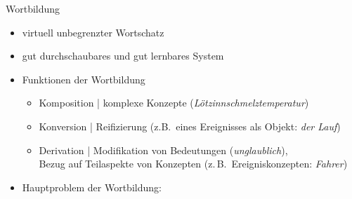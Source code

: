 \begin{frame}
  {Wortbildung}
  \onslide<+->
  \begin{itemize}[<+->]
    \item virtuell unbegrenzter Wortschatz
      \Zeile
    \item gut durchschaubares und \alert{gut lernbares} System\\
      \Zeile
    \item Funktionen der Wortbildung
      \begin{itemize}
        \item Komposition | \alert{komplexe Konzepte} (\textit{Lötzinnschmelztemperatur})
        \item Konversion | \alert{Reifizierung} (z.B.\ eines Ereignisses als Objekt: \textit{der Lauf})
        \item Derivation | \alert{Modifikation von Bedeutungen} (\textit{\alert{un}glaublich}),\\
          \alert{Bezug auf Teilaspekte von Konzepten} (z.\,B.\ Ereigniskonzepten: \textit{Fahr\alert{er}})
      \end{itemize}
      \Halbzeile
    \item Hauptproblem der Wortbildung:\\
  \end{itemize}
\end{frame}

